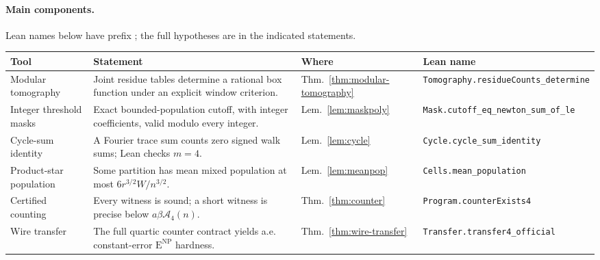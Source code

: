 \documentclass[11pt,letterpaper]{article}
\theoremstyle{definition}
\theoremstyle{remark}
\newcommand{\ENP}{\mathrm{E}^{\mathrm{NP}}}
\begin{document}
\paragraph{Main components.}
Lean names below have prefix ; the full hypotheses are in the indicated statements.
\begin{center}\footnotesize
\begin{tabularx}{\textwidth}{@{}>{\raggedright\arraybackslash}p{}X>{\raggedright\arraybackslash}p{}>{\raggedright\arraybackslash}p{}@{}}
\toprule
Tool & Statement & Where & Lean name\\\midrule
Modular tomography & Joint residue tables determine a rational box function under an explicit window criterion. & Thm.~\ref{thm:modular-tomography} & {\footnotesize\texttt{\mbox{Tomography.}\allowbreak\mbox{residueCounts\_determine}}}\\[2pt]
Integer threshold masks & Exact bounded-population cutoff, with integer coefficients, valid modulo every integer. & Lem.~\ref{lem:maskpoly} & {\footnotesize\texttt{\mbox{Mask.}\allowbreak\mbox{cutoff\_eq\_newton\_sum\_of\_le}}}\\[2pt]
Cycle-sum identity & A Fourier trace sum counts zero signed walk sums; Lean checks \(m=4\). & Lem.~\ref{lem:cycle} & {\footnotesize\texttt{\mbox{Cycle.}\allowbreak\mbox{cycle\_sum\_identity}}}\\[2pt]
Product-star population & Some partition has mean mixed population at most \(6r^{3/2}W/n^{3/2}\). & Lem.~\ref{lem:meanpop} & {\footnotesize\texttt{\mbox{Cells.}\allowbreak\mbox{mean\_population}}}\\[2pt]
Certified counting & Every witness is sound; a short witness is precise below \(a\beta\mathcal A_4(n)\). & Thm.~\ref{thm:counter} & {\footnotesize\texttt{\mbox{Program.}\allowbreak\mbox{counterExists4}}}\\[2pt]
Wire transfer & The full quartic counter contract yields a.e. constant-error \(\ENP\) hardness. & Thm.~\ref{thm:wire-transfer} & {\footnotesize\texttt{\mbox{Transfer.}\allowbreak\mbox{transfer4\_official}}}\\
\bottomrule
\end{tabularx}
\end{center}
\end{document}
